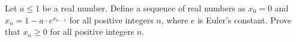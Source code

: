 Let $a\leq1$ be a real number. Define a sequence of real numbers as $x_0=0$ and $x_n=1-a\cdot e^{x_{n-1}}$ for all positive integers $n$, where $e$ is Euler's constant. Prove that $x_n\geq0$ for all positive integers $n$.